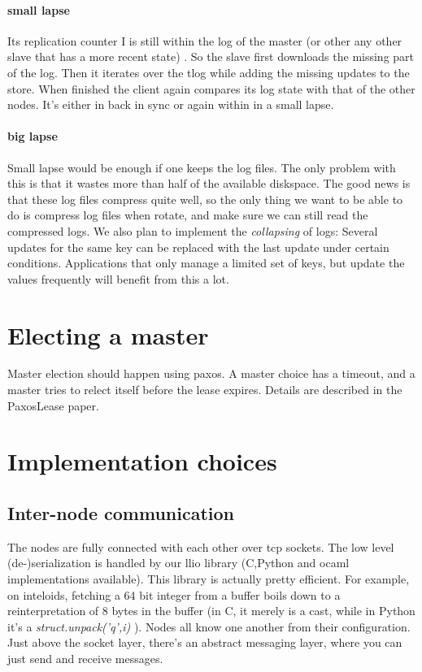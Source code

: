 \paragraph{small lapse}
Its replication counter I is still within the log of the master
(or other any other slave that has a more recent state) . 
So the slave first downloads the missing part of the log.
Then it iterates over the tlog while adding the missing updates to the store.
When finished the client again compares its log state with that of the other nodes. 
It's either in back in sync or again within in a small lapse.

\paragraph{big lapse}
Small lapse would be enough if one keeps the log files. 
The only problem with this is that it wastes more than half of the available diskspace. 
The good news is that these log files compress quite well, 
so the only thing we want to be able to do is compress log files when rotate, 
and make sure we can still read the compressed logs. 
We also plan to implement the \emph{collapsing} of logs: 
Several updates for the same key can be replaced with the last update under certain conditions.
Applications that only manage a limited set of keys, but update the values frequently will benefit from this a lot.
\section{Electing a master}
Master election should happen using paxos. 
A master choice has a timeout, and a master tries to relect itself before the lease expires.
Details are described in the PaxosLease paper.
\section{Implementation choices}
\subsection{Inter-node communication}
The nodes are fully connected with each other over tcp sockets.
The low level (de-)serialization is handled by our llio library (C,Python and ocaml implementations available).
This library is actually pretty efficient.
For example, on inteloids, fetching a 64 bit integer from a buffer boils down to a reinterpretation of 8 bytes in the buffer (in C, it merely is a cast, while in Python it's a \emph{struct.unpack('q',i)} ).
Nodes all know one another from their configuration.
Just above the socket layer, there's an abstract messaging layer, where you can just send and receive messages.




